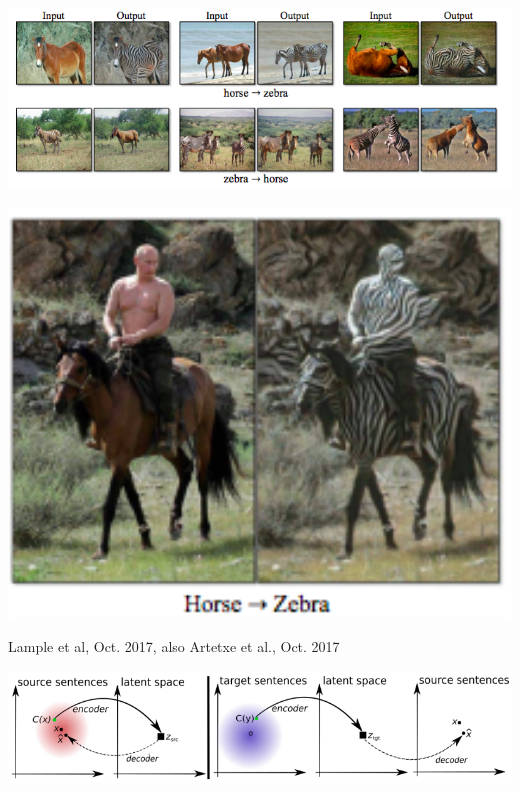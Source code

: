 {

\centerline{\includegraphics[width = 11.0in]{../images/Cycle3}}


\centerline{\includegraphics[width = 6.0in]{../images/Cycle4}}

         {Lample et al, Oct. 2017, also Artetxe et al., Oct. 2017}

\centerline{\includegraphics[width = 10.0in]{../images/Cycle5}}


}
